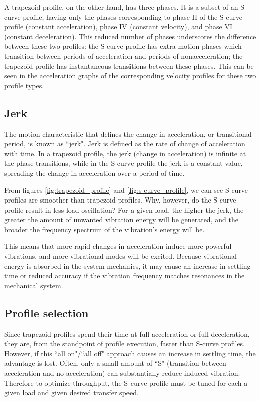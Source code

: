A trapezoid profile, on the other hand, has three phases. It is a subset of an
S-curve profile, having only the phases corresponding to phase II of the S-curve
profile (constant acceleration), phase IV (constant velocity), and phase VI
(constant deceleration). This reduced number of phases underscores the
difference between these two profiles: the S-curve profile has extra motion
phases which transition between periods of acceleration and periods of
nonacceleration; the trapezoid profile has instantaneous transitions between
these phases. This can be seen in the acceleration graphs of the corresponding
velocity profiles for these two profile types.

\subsection{Jerk}

The motion characteristic that defines the change in acceleration, or
transitional period, is known as ``jerk". Jerk is defined as the rate of change
of acceleration with time. In a trapezoid profile, the jerk (change in
acceleration) is infinite at the phase transitions, while in the S-curve profile
the jerk is a constant value, spreading the change in acceleration over a period
of time.

From figures \ref{fig:trapezoid_profile} and \ref{fig:s-curve_profile}, we can
see S-curve profiles are smoother than trapezoid profiles. Why, however, do the
S-curve profile result in less load oscillation? For a given load, the higher
the jerk, the greater the amount of unwanted vibration energy will be generated,
and the broader the frequency spectrum of the vibration's energy will be.

This means that more rapid changes in acceleration induce more powerful
vibrations, and more vibrational modes will be excited. Because vibrational
energy is absorbed in the system mechanics, it may cause an increase in
\gls{settling time} or reduced accuracy if the vibration frequency matches
resonances in the mechanical system.

\subsection{Profile selection}

Since trapezoid profiles spend their time at full acceleration or full
deceleration, they are, from the standpoint of profile execution, faster than
S-curve profiles. However, if this ``all on"/``all off" approach causes an
increase in settling time, the advantage is lost. Often, only a small amount of
``S" (transition between acceleration and no acceleration) can substantially
reduce induced vibration. Therefore to optimize throughput, the S-curve profile
must be tuned for each a given load and given desired transfer speed.

